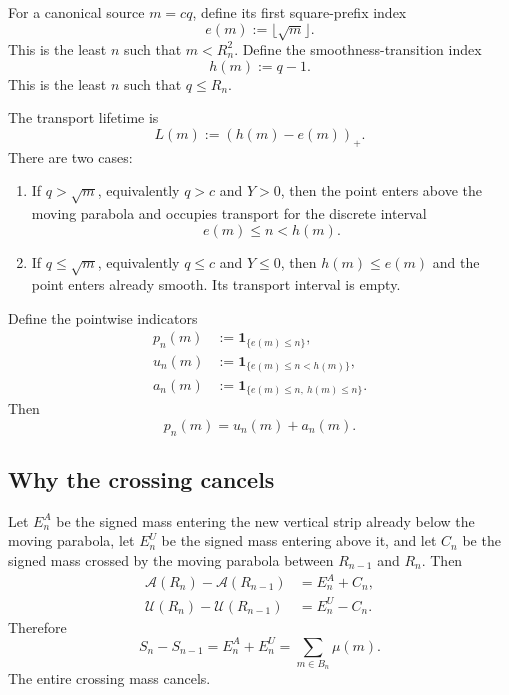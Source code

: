 \documentclass[11pt]{article}
\theoremstyle{definition}
\theoremstyle{remark}
\newcommand{\1}{\mathbf{1}}
\begin{document}
For a canonical source $m=cq$, define its first square-prefix index
\begin{equation}
 e(m):=\lfloor\sqrt m\rfloor.
 \label{eq:entry-index}
\end{equation}
This is the least $n$ such that $m<R_n^2$.  Define the smoothness-transition index
\begin{equation}
 h(m):=q-1.
 \label{eq:transition-index}
\end{equation}
This is the least $n$ such that $q\le R_n$.

The transport lifetime is
\begin{equation}
 L(m):=(h(m)-e(m))_+.
 \label{eq:lifetime}
\end{equation}
There are two cases:

\begin{enumerate}[leftmargin=1.7em,itemsep=0.3em]
\item If $q>\sqrt m$, equivalently $q>c$ and $Y>0$, then the point enters above the moving parabola and occupies transport for the discrete interval
\[
 e(m)\le n<h(m).
\]
\item If $q\le\sqrt m$, equivalently $q\le c$ and $Y\le0$, then $h(m)\le e(m)$ and the point enters already smooth.  Its transport interval is empty.
\end{enumerate}

Define the pointwise indicators
\begin{align}
 p_n(m)&:=\1_{\{e(m)\le n\}},
 \label{eq:p-indicator}\\
 u_n(m)&:=\1_{\{e(m)\le n<h(m)\}},
 \label{eq:u-indicator}\\
 a_n(m)&:=\1_{\{e(m)\le n,\ h(m)\le n\}}.
 \label{eq:a-indicator}
\end{align}
Then
\begin{equation}
 \boxed{p_n(m)=u_n(m)+a_n(m).}
 \label{eq:temporal-partition}
\end{equation}

\subsection{Why the crossing cancels}

Let $E_n^A$ be the signed mass entering the new vertical strip already below the moving parabola, let $E_n^U$ be the signed mass entering above it, and let $C_n$ be the signed mass crossed by the moving parabola between $R_{n-1}$ and $R_n$.  Then
\begin{align}
 \mathcal A(R_n)-\mathcal A(R_{n-1})
 &=E_n^A+C_n,
 \label{eq:Delta-A}\\
 \mathcal U(R_n)-\mathcal U(R_{n-1})
 &=E_n^U-C_n.
 \label{eq:Delta-U}
\end{align}
Therefore
\begin{equation}
 \boxed{
 S_n-S_{n-1}
 =E_n^A+E_n^U
 =\sum_{m\in B_n}\mu(m).
 }
 \label{eq:Delta-S}
\end{equation}
The entire crossing mass cancels.
\end{document}
